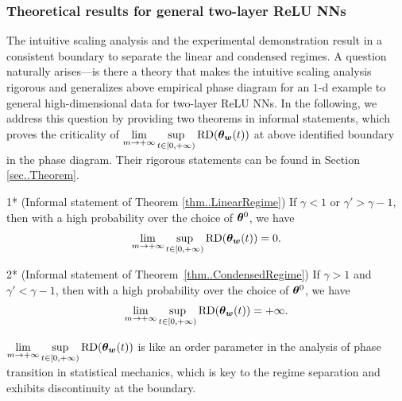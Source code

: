 \documentclass[twoside,11pt]{article}
\begin{document}
\subsubsection{Theoretical results for general two-layer ReLU NNs}
The intuitive scaling analysis and the experimental demonstration result in a consistent boundary to separate the linear and condensed regimes. A question naturally arises---is there a theory that makes the intuitive scaling analysis rigorous and generalizes above empirical phase diagram for an $1$-d example to general high-dimensional data for two-layer ReLU NNs. 
In the following, we address this question by providing two theorems in informal statements, which proves the criticality of $\lim\limits_{m\to+\infty}\sup\limits_{t\in[0,+\infty)}\mathrm{RD}(\bm{\theta}_{\bm{w}}(t))$ at above identified boundary in the phase diagram. Their rigorous statements can be found in Section \ref{sec..Theorem}.



\begin{customthm}{1*}
    (Informal statement of Theorem \ref{thm..LinearRegime}) If $\gamma<1$ or $\gamma'>\gamma-1$, then with a high probability over the choice of $\bm{\theta}^0$, we have
    \begin{equation}
        \lim_{m\to+\infty}\sup\limits_{t\in[0,+\infty)}\mathrm{RD}(\bm{\theta}_{\bm{w}}(t))=0.
    \end{equation}
\end{customthm}
\begin{customthm}{2*}
    (Informal statement of Theorem~\ref{thm..CondensedRegime}) If $\gamma>1$ and $\gamma'<\gamma-1$, then with a high probability over the choice of $\bm{\theta}^0$, we have
    \begin{equation}
        \lim_{m\to+\infty} \sup\limits_{t\in[0,+\infty)}\mathrm{RD}(\bm{\theta}_{\bm{w}}(t))=+\infty.
    \end{equation}
\end{customthm}
\begin{rmk}
 $\lim\limits_{m\to+\infty}\sup\limits_{t\in[0,+\infty)}\mathrm{RD}(\bm{\theta}_{\bm{w}}(t))$ is like an order parameter in the analysis of phase transition in statistical mechanics, which is key to the regime separation and exhibits discontinuity at the boundary.
\end{rmk}
\end{document}
